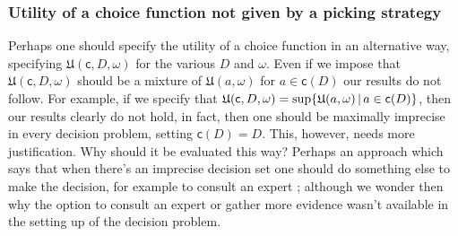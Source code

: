 \documentclass[a4paper]{article}
\renewcommand\c{\mathsf{c}} %
\newcommand\U{\mathfrak{U}} %
\newcommand\SetDelimiter[1][]{
	\nonscript\,#1\vert \allowbreak \nonscript\,\mathopen{}}
\providecommand\given{\SetDelimiter}
\newenvironment{CCM rewritten}
{\begingroup\color{blue}} %
{\endgroup}              %
\begin{document}
%
%
%
%
\subsubsection{Utility of a choice function not given by a picking strategy}

Perhaps one should specify the utility of a choice function in an alternative way, specifying $\U(\c,D,\omega)$ for the various $D$ and $\omega$. Even if we impose that $\U(\c,D,\omega)$ should be a mixture of $\U(a,\omega)$ for $a\in\c(D)$ our results do not follow. For example, if we specify that $\U(\c,D,\omega)=\sup\{\U(a,\omega)\given a\in \c(D)\}$, then our results clearly do not hold, in fact, then one should be maximally imprecise in every decision problem, setting $\c(D)=D$. 
This, however, needs more justification. Why should it be evaluated this way?
Perhaps an approach which says that when there's an imprecise decision set one should do something else to make the decision, for example to consult an expert \citep{de2014efficient}; although we wonder then why the option to consult an expert or gather more evidence wasn't available in the setting up of the decision problem. 
\end{document}
